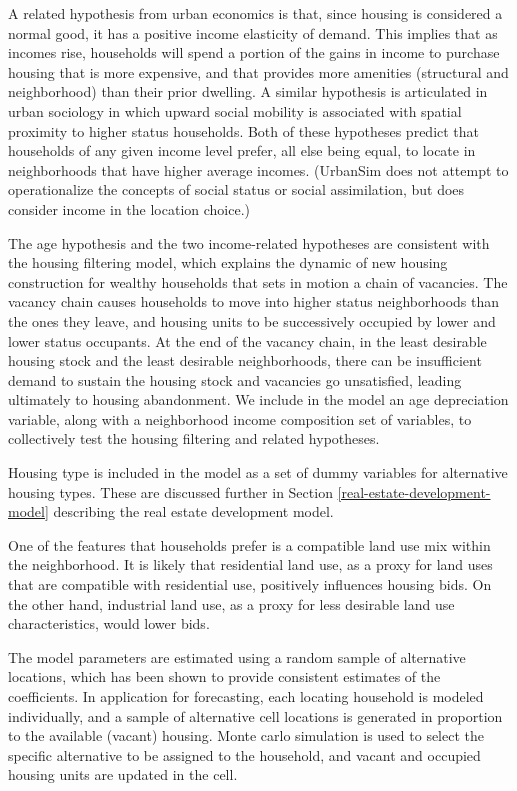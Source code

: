A related hypothesis from urban economics is that, since housing
is considered a normal good, it has a positive income elasticity
of demand.  This implies that as incomes rise, households will
spend a portion of the gains in income to purchase housing that is
more expensive, and that provides more amenities (structural and
neighborhood) than their prior dwelling.  A similar hypothesis is
articulated in urban sociology in which upward social mobility is
associated with spatial proximity to higher status households.
Both of these hypotheses predict that households of any given
income level prefer, all else being equal, to locate in
neighborhoods that have higher average incomes.  (UrbanSim does
not attempt to operationalize the concepts of social status or
social assimilation, but does consider income in the location
choice.)

The age hypothesis and the two income-related hypotheses are
consistent with the housing filtering model, which explains the
dynamic of new housing construction for wealthy households that
sets in motion a chain of vacancies.   The vacancy chain causes
households to move into higher status neighborhoods than the ones
they leave, and housing units to be successively occupied by lower
and lower status occupants.  At the end of the vacancy chain, in
the least desirable housing stock and the least desirable
neighborhoods, there can be insufficient demand to sustain the
housing stock and vacancies go unsatisfied, leading ultimately to
housing abandonment.  We include in the model an age depreciation
variable, along with a neighborhood income composition set of
variables, to collectively test the housing filtering and related
hypotheses.

Housing type is included in the model as a set of dummy variables
for alternative housing types.  These
are discussed further in Section
\ref{real-estate-development-model} describing the real estate
development model.

One of the features that households prefer is a compatible land
use mix within the neighborhood.  It is likely that residential
land use, as a proxy for land uses that are compatible with
residential use, positively influences housing bids.   On the
other hand, industrial land use, as a proxy for less desirable
land use characteristics, would lower bids.

The model parameters are estimated using a random sample of alternative
locations, which has been shown to provide consistent estimates of
the coefficients.  In application for forecasting, each locating
household is modeled individually, and a sample of alternative
cell locations is generated in proportion to the available
(vacant) housing. Monte carlo simulation is used to select the
specific alternative to be assigned to the household, and vacant
and occupied housing units are updated in the cell.

